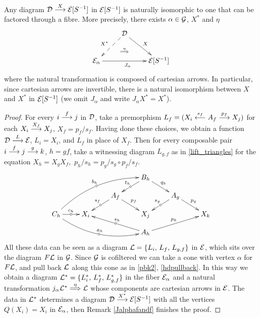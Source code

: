 \begin{proposition}\label{pullbacks se traen a las fibras}
Any diagram ${\mathcal{D} \overset {X} {\longrightarrow} \mathcal{E}[S^{-1}]}$ in  $\mathcal{E}[S^{-1}]$ is naturally isomorphic to one that can be factored through a fibre. More precisely, there exists ${\alpha \in \mathcal{G}}$, $X^*$ and $\eta$
$$
\xymatrix
     {
      & \cc{D} \ar@{-->}[dl]_{X^*} 
               \ar@{}[d]|(.6){ \overset{\eta}{\implies}} 
               \ar[dr]^X 
      & 
    \\
        \cc{E}_\alpha \ar[rr]_{J_\alpha} 
     && \cc{E}[S^{-1}]
      }
$$
where the natural transformation is composed of cartesian arrows. In particular, since cartesian arrows are invertible, there is a natural isomorphism between $X$ and $X^*$ in $\mathcal{E}[S^{-1}]$ (we omit $J_\alpha$ and write $J_\alpha X^* = X^*$). 
\end{proposition}
\begin{proof}
For every $i \overset {f} {\longrightarrow} j$ in $\mathcal{D}$, take a premorphism  
$L_f = (X_i \overset {s_f} {\longleftarrow} A_f \overset {p_f} {\longrightarrow} X_j)$ for each 
$X_i \overset {X_f} {\longrightarrow} X_j$, $X_f = p_f/s_f$. 
Having done these choices, we obtain a function $\mathcal{D} \overset {L} {\longrightarrow} \mathcal{E}$, \mbox{$L_i = X_i$,} and $L_f$ in place of $X_f$. 
Then for every 
composable pair $i \overset {f} {\longrightarrow} j \overset {g} {\longrightarrow} k$, $h = gf$, take a witnessing
diagram $L_{g,f}$ as in \ref{lift_triangles} for the equation 
\mbox{$X_{h} = X_g X_f$, $p_{h}/s_{h} = p_g/s_g \circ p_f/s_f$.}
$$
\xymatrix@R=2.5ex
     {
  &&& B_{h} \ar[ld]_{t_{h}} | \car
             \ar[rd]^{q_{h}}
   \\ 
   && A_f \ar[ld]_{s_f} | \car
          \ar[rd]^{p_f}
   && A_g \ar[ld]_{s_g} | \car
          \ar[rd]^{p_g}
    \\
      C_{h} \ar@/^1.3pc/[rrruu]^{b_{h}} | \car  
             \ar@/_1.3pc/[rrrd]^{a_{h}} | \car       
             \ar[r]^{c_h} | \car
    & X_i
   && X_j
   && X_k
     \\
  &&& A_{h} \ar[llu]_{s_{h}} | \car
        \ar[rru]^{p_{h}} 
     }
$$
All these  data can be seen as a diagram 
$\mathcal{L} = \{L_i,\, L_f,\, L_{g,f}\}$ in $\mathcal{E}$, which sits over the diagram $F\mathcal{L}$ in $\mathcal{G}$. Since $\mathcal{G}$ is cofiltered we can take a cone with vertex $\alpha$ for $F\mathcal{L}$, and pull back  $\mathcal{L}$ along this cone as in \ref{pbk2}, \ref{hdpullback}. In this way we obtain a diagram 
$\mathcal{L}^* = \{L_i^*,\, L_f^*,\, L_{g,f}^*\}$
 in the fiber $\mathcal{E}_\alpha$ and a natural transformation 
 $j_\alpha \mathcal{L}^* \overset {\eta} {\Longrightarrow} \mathcal{L}$ whose components are cartesian arrows in $\mathcal{E}$. The data in $\mathcal{L}^*$ determines a diagram 
$\mathcal{D} \overset {X^*} {\longrightarrow} \mathcal{E}[S^{-1}]$ with all the vertices $Q(X_i) = X_i$ in 
$\mathcal{E}_\alpha$, then Remark \ref{Jalphafandf} finishes the proof.
 \end{proof}
